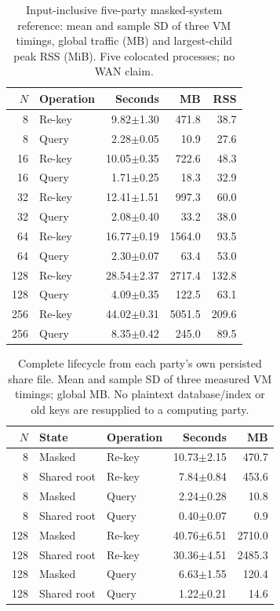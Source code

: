 \begin{table}[t]
\caption{Input-inclusive five-party masked-system reference: mean and sample SD of three VM timings, global traffic (MB) and largest-child peak RSS (MiB). Five colocated processes; no WAN claim.}
\label{tab:secure}\centering\small
\setlength{\tabcolsep}{3pt}
\begin{tabular}{rlrrr}
\toprule
$N$ & Operation & Seconds & MB & RSS \\
\midrule
8 & Re-key & 9.82$\pm$1.30 & 471.8 & 38.7 \\
8 & Query & 2.28$\pm$0.05 & 10.9 & 27.6 \\
16 & Re-key & 10.05$\pm$0.35 & 722.6 & 48.3 \\
16 & Query & 1.71$\pm$0.25 & 18.3 & 32.9 \\
32 & Re-key & 12.41$\pm$1.51 & 997.3 & 60.0 \\
32 & Query & 2.08$\pm$0.40 & 33.2 & 38.0 \\
64 & Re-key & 16.77$\pm$0.19 & 1564.0 & 93.5 \\
64 & Query & 2.30$\pm$0.07 & 63.4 & 53.0 \\
128 & Re-key & 28.54$\pm$2.37 & 2717.4 & 132.8 \\
128 & Query & 4.09$\pm$0.35 & 122.5 & 63.1 \\
256 & Re-key & 44.02$\pm$0.31 & 5051.5 & 209.6 \\
256 & Query & 8.35$\pm$0.42 & 245.0 & 89.5 \\
\bottomrule
\end{tabular}
\end{table}

\begin{table}[t]
\caption{Complete lifecycle from each party's own persisted share file. Mean and sample SD of three measured VM timings; global MB. No plaintext database/index or old keys are resupplied to a computing party.}
\label{tab:persisted}\centering\small
\setlength{\tabcolsep}{3pt}
\begin{tabular}{rllrr}
\toprule
$N$ & State & Operation & Seconds & MB \\
\midrule
8 & Masked & Re-key & 10.73$\pm$2.15 & 470.7 \\
8 & Shared root & Re-key & 7.84$\pm$0.84 & 453.6 \\
8 & Masked & Query & 2.24$\pm$0.28 & 10.8 \\
8 & Shared root & Query & 0.40$\pm$0.07 & 0.9 \\
128 & Masked & Re-key & 40.76$\pm$6.51 & 2710.0 \\
128 & Shared root & Re-key & 30.36$\pm$4.51 & 2485.3 \\
128 & Masked & Query & 6.63$\pm$1.55 & 120.4 \\
128 & Shared root & Query & 1.22$\pm$0.21 & 14.6 \\
\bottomrule
\end{tabular}
\end{table}


